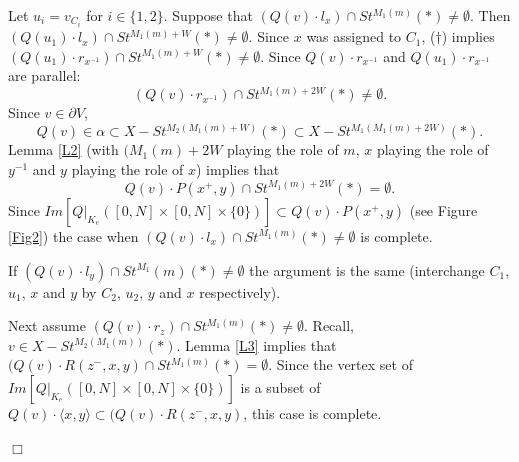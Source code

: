 \documentclass[12pt]{article}
\newenvironment{proof}{\addvspace{12pt}\noindent{\bf Proof:}}{
$\Box$\par\addvspace{12pt}}
\numberwithin{equation}{section}
\begin{document}
\begin{proof} Let $u_i=v_{C_i}$ for $i\in\{1,2\}$. Suppose that $(Q(v)\cdot l_x)\cap St^{M_1(m)}(\ast)\ne\emptyset$. 
Then $(Q(u_1)\cdot l_x)\cap St^{M_1(m)+W}(\ast)\ne \emptyset$. Since $x$ was assigned to $C_1$, ($\dagger$) implies $(Q(u_1)\cdot r_{x^{-1}})\cap St^{M_1(m)+W}(\ast)\ne \emptyset$. Since $Q(v)\cdot r_{x^{-1}}$ and $Q(u_1)\cdot r_{x^{-1}}$ are parallel: 
$$(Q(v)\cdot r_{x^{-1}})\cap St^{M_1(m)+2W}(\ast)\ne \emptyset.$$ 
Since $v\in \partial V$, 
$$Q(v)\in \alpha\subset X-St^{M_2(M_1(m)+W)}(\ast)\subset X-St^{M_1(M_1(m)+2W)}(\ast).$$ 
Lemma \ref{L2} (with $(M_1(m)+2W$ playing the role of $m$, $x$ playing the role of $y^{-1}$ and $y$ playing the role of $x$) implies that 
$$Q(v)\cdot P(x^+,y)\cap St^{M_1(m)+2W}(\ast)=\emptyset.$$ 
Since  $Im[Q|_{K_e}([0,N]\times [0,N]\times\{0\})]\subset Q(v)\cdot P(x^+,y)$ (see Figure \ref{Fig2}) the case when $(Q(v)\cdot l_x)\cap St^{M_1(m)}(\ast)\ne\emptyset$ is complete. 

If $(Q(v)\cdot l_y)\cap St^{M_1}(m)(\ast)\ne \emptyset$ the argument is the same (interchange  $C_1$, $u_1$, $x$ and $y$ by $C_2$, $u_2$, $y$ and $x$ respectively). 

Next assume $(Q(v)\cdot r_z)\cap St^{M_1(m)}(\ast)\ne \emptyset$. Recall, $v\in X-St^{M_2(M_1(m))}(\ast)$. Lemma \ref{L3} implies that $(Q(v)\cdot R(z^-,x,y)\cap St^{M_1(m)}(\ast)=\emptyset$. Since the vertex set of $Im[Q|_{K_e}([0,N]\times [0,N]\times\{0\})]$ is a subset of $Q(v)\cdot \langle x,y\rangle\subset 
(Q(v)\cdot R(z^-,x,y)$, this case is complete. 
\end{proof}
\end{document}
